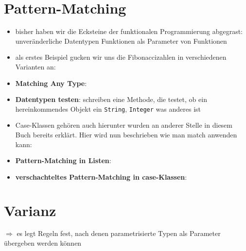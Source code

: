\section{Pattern-Matching}
\begin{itemize}
  \item bisher haben wir die Ecksteine der funktionalen Programmierung
  abgegrast: unveränderliche Datentypen \und Funktionen als Parameter
  von Funktionen
  \item als erstes Beispiel gucken wir uns die Fibonaccizahlen in
  verschiedenen Varianten an:
  
  
  
  \item \textbf{Matching Any Type}:
  
  
  
  \item \textbf{Datentypen testen}: schreiben eine Methode, die testet,
  ob ein hereinkommendes Objekt ein \texttt{String}, \texttt{Integer} \oder 
  was anderes ist
  
  
  
  \item Case-Klassen gehören auch hierunter \und wurden an anderer Stelle
  in diesem Buch bereits erklärt. Hier wird nun beschrieben wie man match
  anwenden kann:
  
  
  
  \item \textbf{Pattern-Matching in Listen}:
  
  
  
  \item \textbf{verschachteltes Pattern-Matching in case-Klassen}:
  
  
\end{itemize}


\section{Varianz}
$\Rightarrow$ es legt Regeln fest, nach denen parametrisierte Typen als Parameter
  übergeben werden können
  

